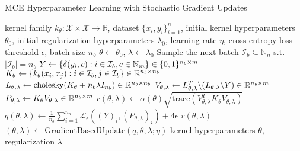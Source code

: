 \documentclass[runningheads, envcountsame, a4paper]{llncs}
\begin{document}
		\begin{algorithm}[tb]
			\caption{\gls{MCE} Hyperparameter Learning with Stochastic Gradient Updates}
			\label{alg:multiclass_conditional_embedding_training}
			\begin{algorithmic}[1]
				 kernel family $k_{\theta} : \mathcal{X} \times \mathcal{X} \to \mathbb{R}$, dataset $\{x_{i}, y_{i}\}_{i = 1}^{n}$, initial kernel hyperparameters $\theta_{0}$, initial regularization hyperparameters $\lambda_{0}$, learning rate $\eta$, cross entropy loss threshold $\epsilon$, batch size $n_{b}$
				\STATE $\theta \leftarrow \theta_{0}$, $\lambda \leftarrow \lambda_{0}$
				\REPEAT
				\STATE Sample the next batch $\mathcal{I}_{b} \subseteq \mathbb{N}_{n}$ s.t. $| \mathcal{I}_{b} | = n_{b}$ %
				\STATE $Y \leftarrow \{\delta(y_{i}, c) : i \in \mathcal{I}_{b}, c \in \mathbb{N}_{m}\} \hspace{\fill} \in \{0, 1\}^{n_{b} \times m}$
				\STATE $K_{\theta} \leftarrow \{k_{\theta}(x_{i}, x_{j}) : i \in \mathcal{I}_{b}, j \in \mathcal{I}_{b}\} \hspace{\fill} \in \mathbb{R}^{n_{b} \times n_{b}}$
				\STATE $L_{\theta, \lambda} \leftarrow \mathrm{cholesky}(K_{\theta} + n_{b} \lambda I_{n_{b}}) \hspace{\fill} \in \mathbb{R}^{n_{b} \times n_{b}}$
				\STATE $V_{\theta, \lambda} \leftarrow L_{\theta, \lambda}^{T} \backslash (L_{\theta, \lambda} \backslash Y) \hspace{\fill} \in \mathbb{R}^{n_{b} \times m}$
				\STATE $P_{\theta, \lambda} \leftarrow K_{\theta} V_{\theta, \lambda} \hspace{\fill} \in \mathbb{R}^{n_{b} \times m}$
				\STATE $r(\theta, \lambda) \leftarrow \alpha(\theta) \sqrt{\mathrm{trace}(V_{\theta, \lambda}^{T} K_{\theta} V_{\theta, \lambda})}$
				\STATE $q(\theta, \lambda) \leftarrow \frac{1}{n_{b}} \sum_{i = 1}^{n_{b}} \mathcal{L}_{\epsilon}((Y)_{i}, (P_{\theta, \lambda})_{i}) + 4 e \; r(\theta, \lambda)$
				\STATE $(\theta, \lambda) \leftarrow \mathrm{GradientBasedUpdate}(q, \theta, \lambda; \eta)$ %
				 kernel hyperparameters $\theta$, regularization $\lambda$
			\end{algorithmic}
		\end{algorithm}
		
\end{document}
